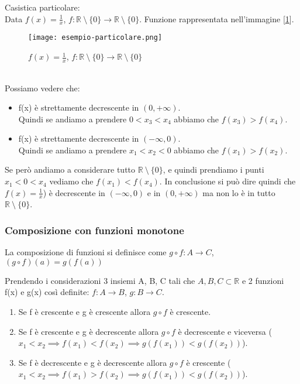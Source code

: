\begin{example}
    Casistica particolare:\\
    Data $f(x)=\frac{1}{x}$, \hspace{.3cm} $f: \mathbb{R} \: \setminus \: \{0\} \longrightarrow \mathbb{R} \: \setminus \: \{0\}$. Funzione rappresentata nell'immagine [\ref{fig:esempio-particolare}].
    \begin{figure}[h!]
        \centering
        \texttt{[image: esempio-particolare.png]}
        \caption{$f(x)=\frac{1}{x}$, \hspace{.3cm} $f: \mathbb{R} \: \setminus \: \{0\} \longrightarrow \mathbb{R} \: \setminus \: \{0\}$}
        \label{fig:esempio-particolare}
    \end{figure}
    \\Possiamo vedere che:
    \begin{itemize}
        \item f(x) è strettamente decrescente in $(0, +\infty)$.\\
        Quindi se andiamo a prendere $0 < x_3 < x_4$ abbiamo che $f(x_3) > f(x_4)$.
        \item f(x) è strettamente decrescente in $(-\infty, 0)$.\\
        Quindi se andiamo a prendere $x_1 < x_2 < 0$ abbiamo che $f(x_1) > f(x_2)$.
    \end{itemize}
    Se però andiamo a considerare tutto $\mathbb{R} \: \setminus \: \{0\}$, e quindi prendiamo i punti $x_1 < 0 < x_4$ vediamo che $f(x_1) < f(x_4)$.
    In conclusione si può dire quindi che $f(x)=\frac{1}{x}$) è decrescente in $(-\infty, 0)$ e in $(0, +\infty)$ ma non lo è in tutto $\mathbb{R} \: \setminus \: \{0\}$.
\end{example}

\subsubsection{Composizione con funzioni monotone}
\begin{definition}[Composizione]
	La composizione di funzioni si definisce come $g \circ f:A \longrightarrow C$, $(g \circ f)(a)=g(f(a))$
\end{definition}
Prendendo i considerazioni 3 insiemi A, B, C tali che $A, B, C \subset \mathbb{R}$ e 2 funzioni f(x) e g(x) così definite: \hspace{.2cm} $f: A \longrightarrow B$, $g: B \longrightarrow C $.
\begin{enumerate}
    \item Se f è crescente e g è crescente allora $g \circ f$ è crescente.
    \item Se f è crescente e g è decrescente allora $g \circ f$ è decrescente e viceversa ($ x_{1} < x_{2} \implies f(x_{1}) < f(x_{2}) \implies g(f(x_{1})) < g(f(x_{2})) $).
    \item Se f è decrescente e g è decrescente allora $g \circ f$ è crescente ($ x_{1} < x_{2} \implies f(x_{1}) > f(x_{2}) \implies g(f(x_{1})) < g(f(x_{2})) $).
\end{enumerate}

